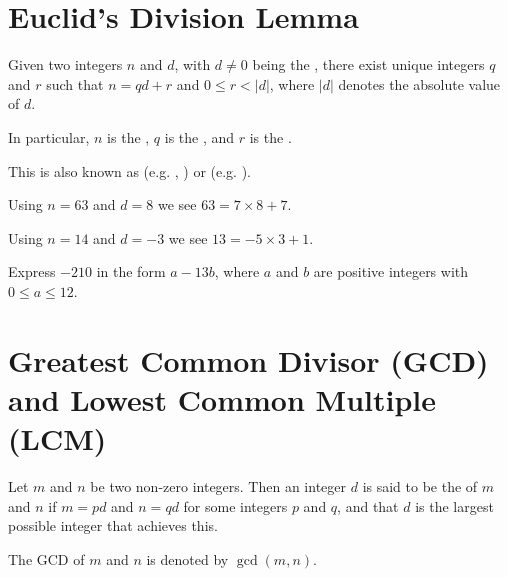 \section{Euclid's Division Lemma}
\begin{lemma}\label{lemma-euclid-division}
    Given two integers $n$ and $d$, with $d \neq 0$ being the , there exist unique integers $q$ and $r$ such that $n = qd + r$ and $0 \leq r < |d|$, where $|d|$ denotes the absolute value of $d$.

    In particular, $n$ is the , $q$ is the , and $r$ is the .
\end{lemma}
\begin{remark}
    This is also known as  (e.g. \cite[p.~4]{dummit_foote_2004}, \cite[p.~3]{gallian_2016}) or  (e.g. \cite[\S 21]{clark_1984}).
\end{remark}

\begin{example}
    Using $n = 63$ and $d = 8$ we see $63 = 7\times8 + 7$.
\end{example}

\begin{example}
    Using $n = 14$ and $d = -3$ we see $13 = -5\times3 + 1$.
\end{example}

\begin{exercise}
    Express $-210$ in the form $a-13b$, where $a$ and $b$ are positive integers with $0 \leq a \leq 12$.
\end{exercise}

\section{Greatest Common Divisor (GCD) and Lowest Common Multiple (LCM)}
\begin{definition}
    Let $m$ and $n$ be two non-zero integers. Then an integer $d$ is said to be the  of $m$ and $n$ if $m = pd$ and $n = qd$ for some integers $p$ and $q$, and that $d$ is the largest possible integer that achieves this.

    The GCD of $m$ and $n$ is denoted by $\gcd(m, n)$.
\end{definition}

